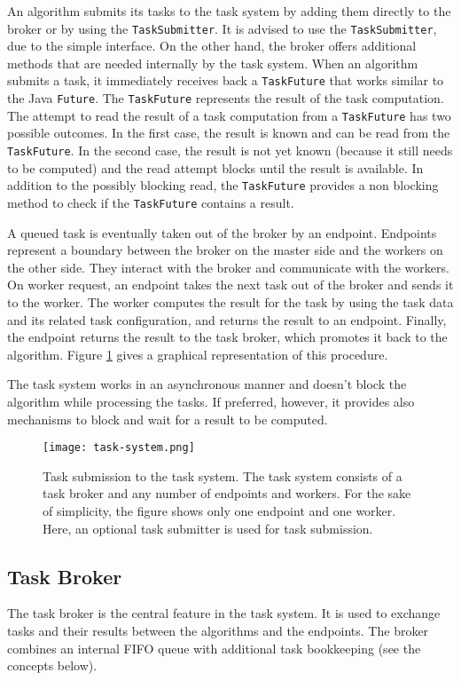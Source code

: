 An algorithm submits its tasks to the task system by adding them directly to the broker or by using the \texttt{TaskSubmitter}. It is advised to use the \texttt{TaskSubmitter}, due to the simple interface. On the other hand, the broker offers additional methods that are needed internally by the task system. When an algorithm submits a task, it immediately receives back a \texttt{TaskFuture} that works similar to the Java \texttt{Future}. The \texttt{TaskFuture} represents the result of the task computation. The attempt to read the result of a task computation from a \texttt{TaskFuture} has two possible outcomes. In the first case, the result is known and can be read from the \texttt{TaskFuture}. In the second case, the result is not yet known (because it still needs to be computed) and the read attempt blocks until the result is available. In addition to the possibly blocking read, the \texttt{TaskFuture} provides a non blocking method to check if the \texttt{TaskFuture} contains a result.

A queued task is eventually taken out of the broker by an endpoint. Endpoints represent a boundary between the broker on the master side and the workers on the other side. They interact with the broker and communicate with the workers. On worker request, an endpoint takes the next task out of the broker and sends it to the worker. The worker computes the result for the task by using the task data and its related task configuration, and returns the result to an endpoint. Finally, the endpoint returns the result to the task broker, which promotes it back to the algorithm. Figure \ref{fig:task-system} gives a graphical representation of this procedure.

The task system works in an asynchronous manner and doesn't block the algorithm while processing the tasks. If preferred, however, it provides also mechanisms to block and wait for a result to be computed.

\begin{figure}
  \centering
  \texttt{[image: task-system.png]}
  \caption[Task submission to the task system]{Task submission to the task system. The task system consists of a task broker and any number of endpoints and workers. For the sake of simplicity, the figure shows only one endpoint and one worker. Here, an optional task submitter is used for task submission.}
  \label{fig:task-system}
\end{figure}

\subsection{Task Broker}
The task broker is the central feature in the task system. It is used to exchange tasks and their results between the algorithms and the endpoints. The broker combines an internal FIFO queue with additional task bookkeeping (see the concepts below).

